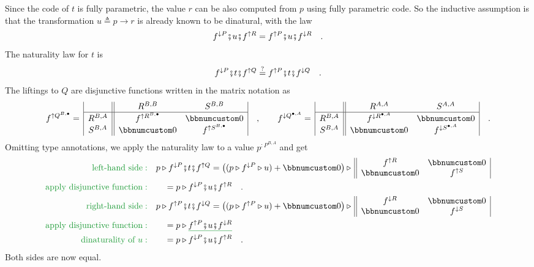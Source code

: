 Since the code of $t$ is fully parametric, the value $r$ can be
also computed from $p$ using fully parametric code. So the inductive
assumption is that the transformation $u\triangleq p\rightarrow r$
is already known to be dinatural, with the law
\[
f^{\downarrow P}\bef u\bef f^{\uparrow R}=f^{\uparrow P}\bef u\bef f^{\downarrow R}\quad.
\]
 The naturality law for $t$ is
\[
f^{\downarrow P}\bef t\bef f^{\uparrow Q}\overset{?}{=}f^{\uparrow P}\bef t\bef f^{\downarrow Q}\quad.
\]
The liftings to $Q$ are disjunctive functions written in the matrix
notation as
\[
f^{\uparrow Q^{B,\bullet}}=\,\begin{array}{|c||cc|}
 & R^{B,B} & S^{B,B}\\
\hline R^{B,A} & f^{\uparrow R^{B,\bullet}} & \bbnum 0\\
S^{B,A} & \bbnum 0 & f^{\uparrow S^{B,\bullet}}
\end{array}\quad,\quad\quad f^{\downarrow Q^{\bullet,A}}=\,\begin{array}{|c||cc|}
 & R^{A,A} & S^{A,A}\\
\hline R^{B,A} & f^{\downarrow R^{\bullet,A}} & \bbnum 0\\
S^{B,A} & \bbnum 0 & f^{\downarrow S^{\bullet,A}}
\end{array}\quad.
\]
Omitting type annotations, we apply the naturality law to a value
$p^{:P^{B,A}}$ and get
\begin{align*}
{\color{greenunder}\text{left-hand side}:}\quad & p\triangleright f^{\downarrow P}\bef t\bef f^{\uparrow Q}=\big((p\triangleright f^{\downarrow P}\triangleright u)+\bbnum 0\big)\triangleright\,\begin{array}{||cc|}
f^{\uparrow R} & \bbnum 0\\
\bbnum 0 & f^{\uparrow S}
\end{array}\\
{\color{greenunder}\text{apply disjunctive function}:}\quad & \quad=p\triangleright f^{\downarrow P}\bef u\bef f^{\uparrow R}\quad.\\
{\color{greenunder}\text{right-hand side}:}\quad & p\triangleright f^{\uparrow P}\bef t\bef f^{\downarrow Q}=\big((p\triangleright f^{\uparrow P}\triangleright u)+\bbnum 0\big)\triangleright\,\begin{array}{||cc|}
f^{\downarrow R} & \bbnum 0\\
\bbnum 0 & f^{\downarrow S}
\end{array}\\
{\color{greenunder}\text{apply disjunctive function}:}\quad & \quad=p\triangleright\gunderline{f^{\uparrow P}\bef u\bef f^{\downarrow R}}\\
{\color{greenunder}\text{dinaturality of }u:}\quad & \quad=p\triangleright f^{\downarrow P}\bef u\bef f^{\uparrow R}\quad.
\end{align*}
Both sides are now equal.

